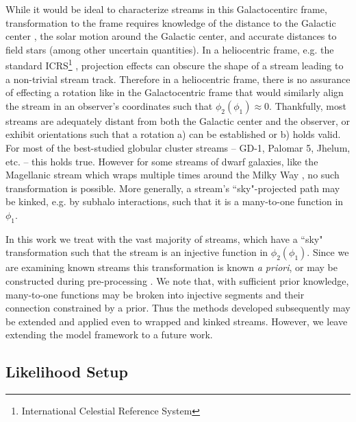 \documentclass[twocolumn]{aastex631}
\newcommand{\stream}[1]{#1}
\begin{document}
        While it would be ideal to characterize streams in this Galactocentirc
        frame, transformation to the frame requires knowledge of the distance to
        the Galactic center  \citep{GRAVITY2018, BennettBovy2019, Leung+2022},
        the solar motion around the Galactic center, and accurate distances to
        field stars (among other uncertain quantities). In a heliocentric frame,
        e.g. the standard ICRS\footnote{International Celestial Reference
        System} \citep{ICRS1997}, projection effects can obscure the shape of a
        stream leading to a non-trivial stream track. Therefore in a
        heliocentric frame, there is no assurance of effecting a rotation like
        in the Galactocentric frame that would similarly align the stream in an
        observer's coordinates such that $\phi_2(\phi_1) \approx 0$.
        Thankfully, most streams are adequately distant from both the Galactic
        center and the observer, or exhibit orientations such that a rotation a)
        can be established or b) holds valid. For most of the best-studied
        globular cluster streams -- \stream{GD-1}, \stream{Palomar 5},
        \stream{Jhelum}, etc. -- this holds true. However for some streams of
        dwarf galaxies, like the Magellanic stream which wraps multiple times
        around the Milky Way \citep{WannierWrixon1972}, no such transformation
        is possible. More generally, a stream's ``sky"-projected path may be
        kinked, e.g. by subhalo interactions, such that it is a many-to-one
        function in $\phi_1$.

        In this work we treat with the vast majority of streams, which have a
        ``sky" transformation such that the stream is an injective function in
        $\phi_2(\phi_1)$.  Since we are examining known streams this
        transformation is known \textit{a priori}, or may be constructed during
        pre-processing \citep[see][\S2.1]{Starkman+2023}.  We note that, with
        sufficient prior knowledge, many-to-one functions may be broken into
        injective segments and their connection constrained by a prior. Thus the
        methods developed subsequently may be extended and applied even to
        wrapped and kinked streams. However, we leave extending the model
        framework to a future work.

    \subsection{Likelihood Setup}\label{sub:method:likelihood_setup}
\end{document}
